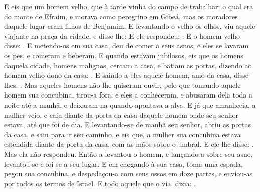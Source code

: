 {  E eis que um homem velho, que à tarde vinha do campo de trabalhar; o qual era do monte de Efraim, e morava como peregrino em Gibeá, mas os moradores daquele lugar eram filhos de Benjamim.
  E levantando o velho os olhos, viu aquele viajante na praça da cidade, e disse-lhe: 
  E ele respondeu: .
  E o homem velho disse: .
  E metendo-os em sua casa, deu de comer a seus asnos; e eles se lavaram os pés, e comeram e beberam.
  E quando estavam jubilosos, eis que os homens daquela cidade, homens malignos, cercam a casa, e batiam as portas, dizendo ao homem velho dono da casa: .
  E saindo a eles aquele homem, amo da casa, disse-lhes: .
  Mas aqueles homens não lhe quiseram ouvir; pelo que tomando aquele homem sua concubina, tirou-a fora: e eles a conheceram, e abusaram dela toda a noite até a manhã, e deixaram-na quando apontava a alva.
  E já que amanhecia, a mulher veio, e caiu diante da porta da casa daquele homem onde seu senhor estava, até que foi de dia.
  E levantando-se de manhã seu senhor, abriu as portas da casa, e saiu para ir seu caminho, e eis que, a mulher sua concubina estava estendida diante da porta da casa, com as mãos sobre o umbral.
  E ele lhe disse: . Mas ela não respondeu. Então a levantou o homem, e lançando-a sobre seu asno, levantou-se e foi-se a seu lugar.
  E em chegando à sua casa, toma uma espada, pegou sua concubina, e despedaçou-a com seus ossos em doze partes, e enviou-as por todos os termos de Israel.
  E todo aquele que o via, dizia: . %
\par }


